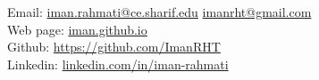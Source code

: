 { %
\noindent
Email: \href{mailto:iman.rahmati@ce.sharif.edu}{iman.rahmati@ce.sharif.edu} \space \href{mailto:imanrht@gmail.com}{imanrht@gmail.com} \\
Web page: \href{https://imanrht.github.io}{iman.github.io} \\
Github: \href{https://github.com/ImanRHT}{https://github.com/ImanRHT}\\
Linkedin: \href{https://linkedin.com/in/iman-rahmati}{linkedin.com/in/iman-rahmati}\\
}
